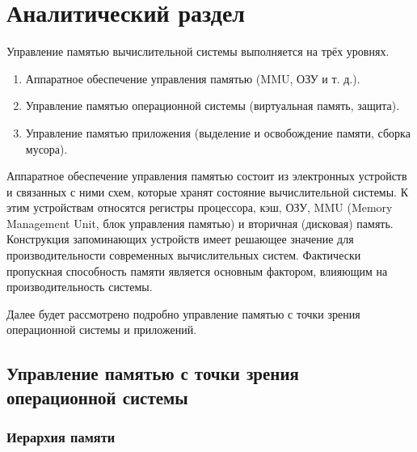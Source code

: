 \chapter{Аналитический раздел}


Управление памятью вычислительной системы выполняется на трёх уровнях. 

\begin{enumerate}[label*=\arabic*.]
	\item Аппаратное обеспечение управления памятью (MMU, ОЗУ и т. д.).
	\item Управление памятью операционной системы (виртуальная память, защита).
	\item Управление памятью приложения (выделение и освобождение памяти, сборка мусора).
\end{enumerate}

Аппаратное обеспечение управления памятью состоит из электронных устройств и связанных с ними схем, которые хранят состояние вычислительной системы. К этим устройствам относятся регистры процессора, кэш, ОЗУ, MMU (Memory Management Unit, блок управления памятью) и вторичная (дисковая) память. Конструкция запоминающих устройств имеет решающее значение для производительности современных вычислительных систем. Фактически пропускная способность памяти является основным фактором, влияющим на производительность системы.~\cite{glossary}

Далее будет рассмотрено подробно управление памятью с точки зрения операционной системы и приложений.

\section*{Управление памятью с точки зрения операционной системы}

\subsection*{Иерархия памяти}

